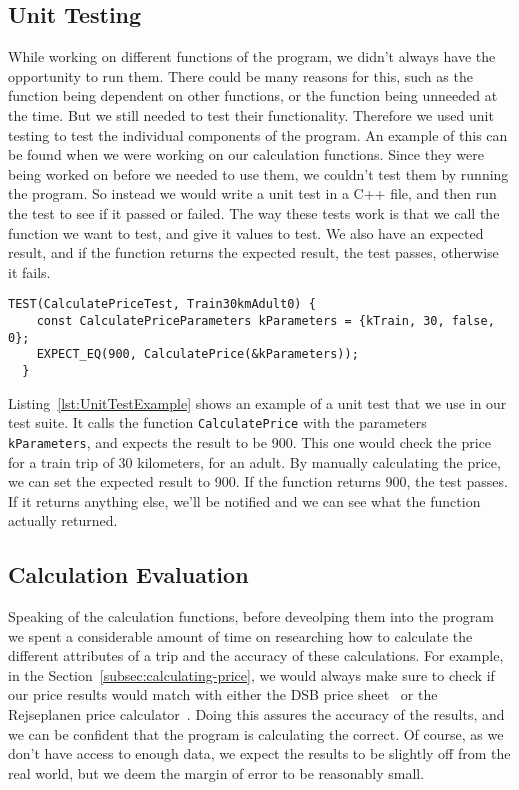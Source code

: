 \subsection{Unit Testing}\label{subsec:unit-testing}

While working on different functions of the program, we didn't always have the opportunity to run them.
There could be many reasons for this, such as the function being dependent on other functions, or the function being
unneeded at the time.
But we still needed to test their functionality.
Therefore we used unit testing to test the individual components of the program.
An example of this can be found when we were working on our calculation functions.
Since they were being worked on before we needed to use them, we couldn't test them by running the program.
So instead we would write a unit test in a C++ file, and then run the test to see if it passed or failed.
The way these tests work is that we call the function we want to test, and give it values to test.
We also have an expected result, and if the function returns the expected result, the test passes, otherwise it fails.

\begin{lstlisting}[label={lst:UnitTestExample}, caption={Example of a unit test.}]
  TEST(CalculatePriceTest, Train30kmAdult0) {
    const CalculatePriceParameters kParameters = {kTrain, 30, false, 0};
    EXPECT_EQ(900, CalculatePrice(&kParameters));
  }
\end{lstlisting}

Listing~\ref{lst:UnitTestExample} shows an example of a unit test that we use in our test suite.
It calls the function \texttt{CalculatePrice} with the parameters \texttt{kParameters}, and expects the result to be
900.
This one would check the price for a train trip of 30 kilometers, for an adult.
By manually calculating the price, we can set the expected result to 900.
If the function returns 900, the test passes.
If it returns anything else, we'll be notified and we can see what the function actually returned.

\subsection{Calculation Evaluation}\label{subsec:calc-evaluation}

Speaking of the calculation functions, before deveolping them into the program we spent a considerable amount of time
on researching how to calculate the different attributes of a trip and the accuracy of these calculations.
For example, in the Section~\ref{subsec:calculating-price}, we would always make sure to check if our price results
would match with either the DSB price sheet~\cite{price_sheet} or the Rejseplanen price
calculator~\cite{price_calculator}.
Doing this assures the accuracy of the results, and we can be confident that the program is calculating the correct.
Of course, as we don't have access to enough data, we expect the results to be slightly off from the real world, but
we deem the margin of error to be reasonably small.


